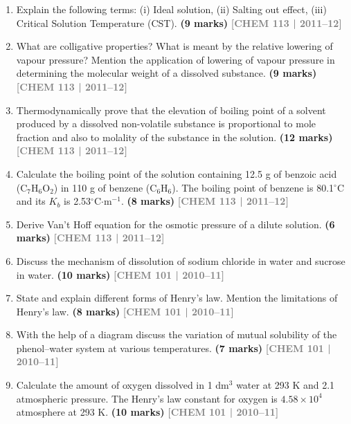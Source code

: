 \documentclass[12pt,a3paper]{article}
\newcommand{\yr}[1]{\hfill\textcolor{gray}{\small\textbf{[#1]}}}
\newcommand{\mk}[1]{\textcolor{orange!70!black}{\small\textbf{(#1 marks)}}}
\begin{document}
\begin{enumerate}
\item Explain the following terms: (i) Ideal solution, (ii) Salting out effect, (iii) Critical Solution Temperature (CST). \mk{9}
\yr{CHEM 113 | 2011--12}



\item What are colligative properties? What is meant by the relative lowering of vapour pressure? Mention the application of lowering of vapour pressure in determining the molecular weight of a dissolved substance. \mk{9}
\yr{CHEM 113 | 2011--12}



\item Thermodynamically prove that the elevation of boiling point of a solvent produced by a dissolved non-volatile substance is proportional to mole fraction and also to molality of the substance in the solution. \mk{12}
\yr{CHEM 113 | 2011--12}



\item Calculate the boiling point of the solution containing 12.5 g of benzoic acid (C$_7$H$_6$O$_2$) in 110 g of benzene (C$_6$H$_6$). The boiling point of benzene is 80.1$^\circ$C and its $K_b$ is 2.53$^\circ$C$\cdot$m$^{-1}$. \mk{8}
\yr{CHEM 113 | 2011--12}



\item Derive Van't Hoff equation for the osmotic pressure of a dilute solution. \mk{6}
\yr{CHEM 113 | 2011--12}



\item Discuss the mechanism of dissolution of sodium chloride in water and sucrose in water. \mk{10}
\yr{CHEM 101 | 2010--11}



\item State and explain different forms of Henry's law. Mention the limitations of Henry's law. \mk{8}
\yr{CHEM 101 | 2010--11}



\item With the help of a diagram discuss the variation of mutual solubility of the phenol--water system at various temperatures. \mk{7}
\yr{CHEM 101 | 2010--11}



\item Calculate the amount of oxygen dissolved in 1 dm$^3$ water at 293 K and 2.1 atmospheric pressure. The Henry's law constant for oxygen is $4.58 \times 10^4$ atmosphere at 293 K. \mk{10}
\yr{CHEM 101 | 2010--11}




\end{enumerate}
\end{document}
